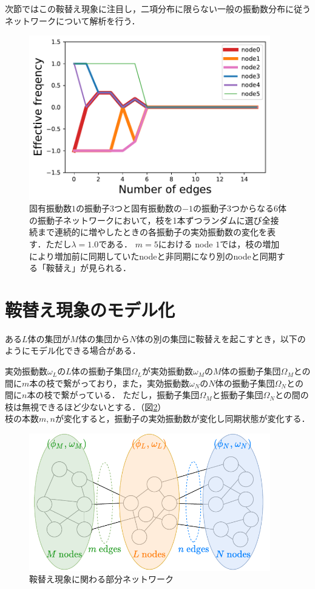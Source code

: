 \documentclass[../main]{subfiles}
\begin{document}
次節ではこの鞍替え現象に注目し，二項分布に限らない一般の振動数分布に従うネットワークについて解析を行う．

\begin{figure}[tbp]
\centering
\includegraphics[width=105mm]{./images/cutting_N6K10.pdf}
\centering
\caption{固有振動数$1$の振動子3つと固有振動数の$-1$の振動子3つからなる6体の振動子ネットワークにおいて，枝を1本ずつランダムに選び全接続まで連続的に増やしたときの各振動子の実効振動数の変化を表す．ただし$\lambda=1.0$である．
$m=5$における node $1$では，枝の増加により増加前に同期していたnodeと非同期になり別のnodeと同期する「鞍替え」が見られる．}
\label{fig:cutting_N6K1}
\end{figure}

\section{鞍替え現象のモデル化}
ある$L$体の集団が$M$体の集団から$N$体の別の集団に鞍替えを起こすとき，以下のようにモデル化できる場合がある．
\begin{screen}
実効振動数$\omega_L$の$L$体の振動子集団$\Omega_L$が実効振動数$\omega_M$の$M$体の振動子集団$\Omega_M$との間に$m$本の枝で繋がっており，また，実効振動数$\omega_N$の$N$体の振動子集団$\Omega_N$との間に$n$本の枝で繋がっている．
ただし，振動子集団$\Omega_M$と振動子集団$\Omega_N$との間の枝は無視できるほど少ないとする．（図\ref{fig:switch}）\\
枝の本数$m,n$が変化すると，振動子の実効振動数が変化し同期状態が変化する．
\end{screen}

\begin{figure}[tbp]
\centering
\includegraphics[width=105mm]{./images/three_obj_before.pdf}
\centering
\caption{鞍替え現象に関わる部分ネットワーク}
\label{fig:switch}
\end{figure}
\end{document}

